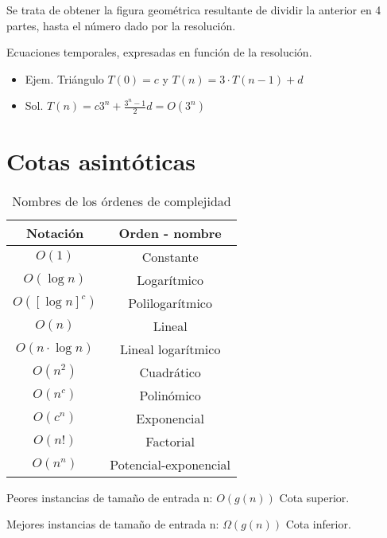 Se trata de obtener la figura geométrica resultante de dividir la anterior en 4 partes, hasta el número dado por la resolución.

Ecuaciones temporales, expresadas en función de la resolución.
\begin{itemize}
	\item Ejem. Triángulo $T\left(0\right)=c$ y $T\left(n\right)=3\cdot T\left(n-1\right)+d$
	\item Sol. $T\left(n\right)= c3^n+ \frac{3^n-1}{2}d=O\left(3^n\right)$
\end{itemize}

\section{Cotas asintóticas}
\begin{table}[H]
	\begin{tabular}{|c|c|}
		\hline
		\rowcolor[HTML]{BFBFBF}
		Notación                       & Orden - nombre        \\ \hline
		$O\left(1\right)$              & Constante             \\ \hline
		$O\left(\log n\right)$         & Logarítmico           \\ \hline
		$O\left([\log n]^c\right)$     & Polilogarítmico       \\ \hline
		$O\left(n\right)$              & Lineal                \\ \hline
		$O\left(n \cdot \log n\right)$ & Lineal logarítmico    \\ \hline
		$O(n^2)$                       & Cuadrático            \\ \hline
		$O\left(n^c\right)$            & Polinómico            \\ \hline
		$O\left(c^n\right)$            & Exponencial           \\ \hline
		$O\left(n!\right)$             & Factorial             \\ \hline
		$O\left(n^n\right)$            & Potencial-exponencial \\ \hline
	\end{tabular}
	\caption{Nombres de los órdenes de complejidad}
\end{table}

Peores instancias de tamaño de entrada n: $O\left(g\left(n\right)\right)$ Cota superior.

Mejores instancias de tamaño de entrada n: $\Omega\left(g\left(n\right)\right)$ Cota inferior.

